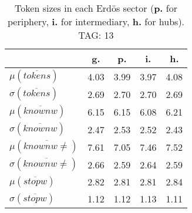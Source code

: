 \begin{table}[h!]
\begin{center}
\begin{tabular}{| l || c | c | c | c |}\hline
 & {\bf g.} & {\bf p.} & {\bf i.} & {\bf h.} \\\hline\hline
$\mu(\overline{tokens})$ & 4.03  & 3.99  & 3.97  & 4.08 \\
$\sigma(\overline{tokens})$ & 2.69  & 2.70  & 2.70  & 2.69 \\\hline
$\mu(\overline{knownw})$ & 6.15  & 6.15  & 6.08  & 6.21 \\
$\sigma(\overline{knownw})$ & 2.47  & 2.53  & 2.52  & 2.43 \\\hline
$\mu(\overline{knownw \neq})$ & 7.61  & 7.05  & 7.46  & 7.52 \\
$\sigma(\overline{knownw \neq})$ & 2.66  & 2.59  & 2.64  & 2.59 \\\hline
$\mu(\overline{stopw})$ & 2.82  & 2.81  & 2.81  & 2.84 \\
$\sigma(\overline{stopw})$ & 1.12  & 1.12  & 1.13  & 1.11 \\\hline
\end{tabular}
\caption{Token sizes in each Erd\"os sector ({{\bf p.}} for periphery, {{\bf i.}} for intermediary, {{\bf h.}} for hubs). TAG: 13}
\end{center}
\end{table}